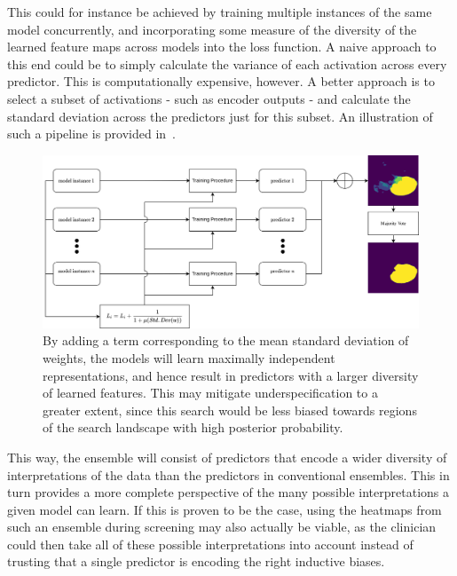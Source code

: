     This could for instance be achieved by training multiple instances of the same model concurrently, and incorporating some measure of the diversity of the learned feature maps across models into the loss function. A naive approach to this end could be to simply calculate the variance of each activation across every predictor. This is computationally expensive, however. A better approach is to select a subset of activations  - such as encoder outputs - and calculate the standard deviation across the predictors just for this subset.  An illustration of such a pipeline is provided in~.
    
    \begin{figure}[htb]
        \centering
        \includegraphics[width=\linewidth]{illustrations/diversity_search.png}
        \caption[Deep Diversity Search]{By adding a term corresponding to the mean standard deviation of weights, the models will learn maximally independent representations, and hence result in predictors with a larger diversity of learned features. This may mitigate underspecification to a greater extent, since this search would be less biased towards regions of the search landscape with high posterior probability.}
        \label{fig:diversity}
    \end{figure}
    
    This way, the ensemble will consist of predictors that encode a wider diversity of interpretations of the data than the predictors in conventional ensembles. This in turn provides a more complete perspective of the many possible interpretations a given model can learn. If this is proven to be the case, using the heatmaps from such an ensemble during screening may also actually be viable, as the clinician could then take all of these possible interpretations into account instead of trusting that a single predictor is encoding the right inductive biases.  
